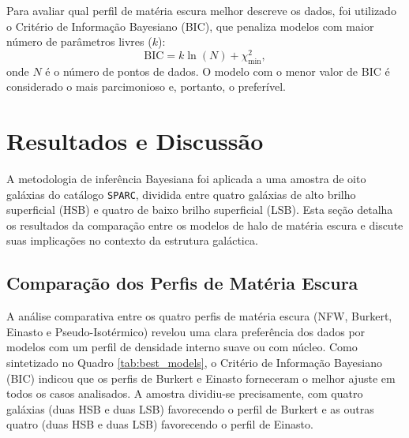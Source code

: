 \documentclass[a4paper]{article}
\begin{document}
Para avaliar qual perfil de matéria escura melhor descreve os dados, foi utilizado o Critério de Informação Bayesiano (BIC), que penaliza modelos com maior número de parâmetros livres ($k$):
\begin{equation}
    \text{BIC} = k \ln(N) + \chi^2_{\text{min}},
\end{equation}
onde $N$ é o número de pontos de dados. O modelo com o menor valor de BIC é considerado o mais parcimonioso e, portanto, o preferível.

\section{Resultados e Discussão}
A metodologia de inferência Bayesiana foi aplicada a uma amostra de oito galáxias do catálogo \texttt{SPARC}, dividida entre quatro galáxias de alto brilho superficial (HSB) e quatro de baixo brilho superficial (LSB). Esta seção detalha os resultados da comparação entre os modelos de halo de matéria escura e discute suas implicações no contexto da estrutura galáctica.

\subsection{Comparação dos Perfis de Matéria Escura}
A análise comparativa entre os quatro perfis de matéria escura (NFW, Burkert, Einasto e Pseudo-Isotérmico) revelou uma clara preferência dos dados por modelos com um perfil de densidade interno suave ou com núcleo. Como sintetizado no Quadro \ref{tab:best_models}, o Critério de Informação Bayesiano (BIC) indicou que os perfis de Burkert e Einasto forneceram o melhor ajuste em todos os casos analisados. A amostra dividiu-se precisamente, com quatro galáxias (duas HSB e duas LSB) favorecendo o perfil de Burkert e as outras quatro (duas HSB e duas LSB) favorecendo o perfil de Einasto.
\end{document}
